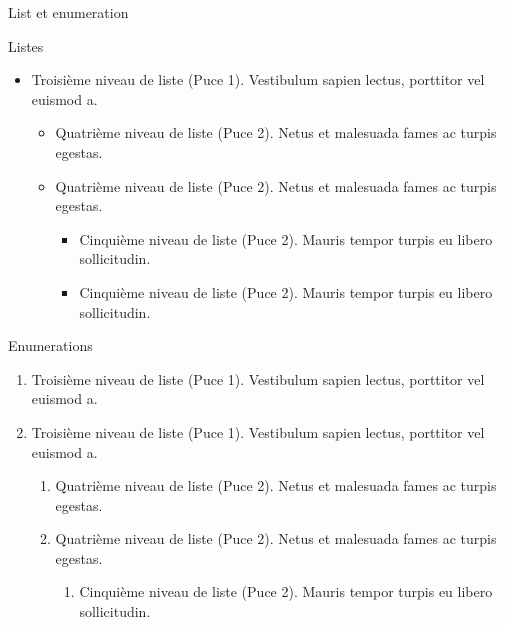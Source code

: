 \begin{frame}{List et enumeration}
   \begin{block}{Listes}
      \begin{itemize}
         \item Troisième niveau de liste (Puce 1). Vestibulum sapien lectus, porttitor vel euismod a.
         \begin{itemize}
            \item Quatrième niveau de liste (Puce 2). Netus et malesuada fames ac turpis egestas.
            \item Quatrième niveau de liste (Puce 2). Netus et malesuada fames ac turpis egestas.
            \begin{itemize}
               \item Cinquième niveau de liste (Puce 2). Mauris tempor turpis eu libero sollicitudin.
               \item Cinquième niveau de liste (Puce 2). Mauris tempor turpis eu libero sollicitudin.
            \end{itemize}
          \end{itemize}
        \end{itemize}
   \end{block}

   \begin{block}{Enumerations}
      \begin{enumerate}
         \item Troisième niveau de liste (Puce 1). Vestibulum sapien lectus, porttitor vel euismod a.
         \item Troisième niveau de liste (Puce 1). Vestibulum sapien lectus, porttitor vel euismod a.
         \begin{enumerate}
            \item Quatrième niveau de liste (Puce 2). Netus et malesuada fames ac turpis egestas.
            \item Quatrième niveau de liste (Puce 2). Netus et malesuada fames ac turpis egestas.
            \begin{enumerate}
               \item Cinquième niveau de liste (Puce 2). Mauris tempor turpis eu libero sollicitudin.
            \end{enumerate}
          \end{enumerate}
        \end{enumerate}
   \end{block}
\end{frame}


